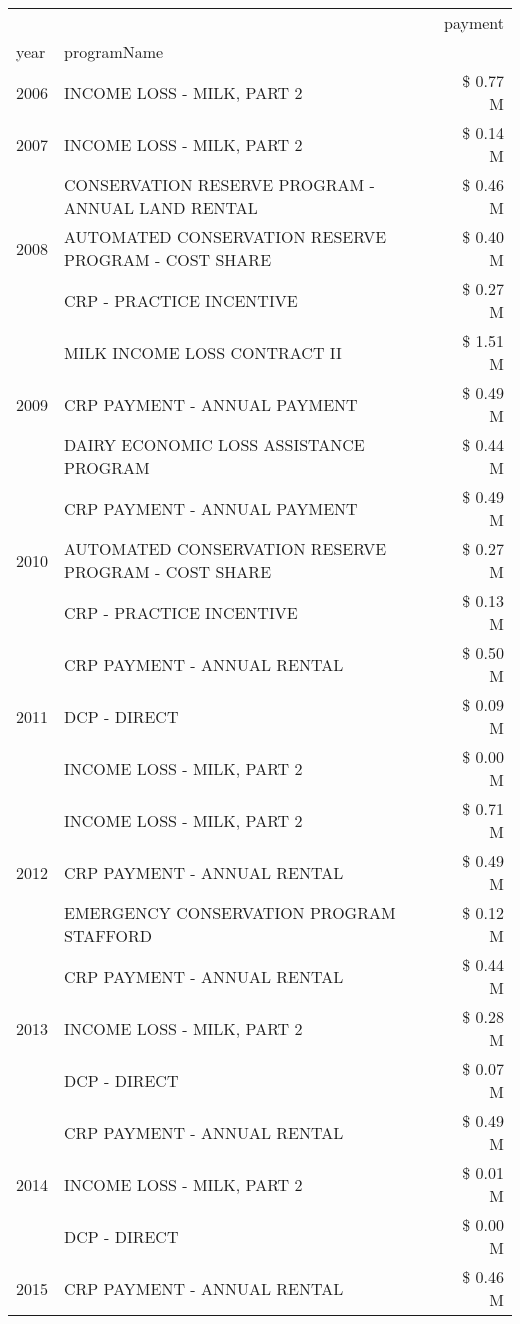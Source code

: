 \begin{tabular}{llr}
\toprule
 &  & payment \\
year & programName &  \\
\midrule
2006 & INCOME LOSS - MILK, PART 2 & \$ 0.77 M \\
\cline{1-3}
2007 & INCOME LOSS - MILK, PART 2 & \$ 0.14 M \\
\cline{1-3}
\multirow[t]{3}{*}{2008} & CONSERVATION RESERVE PROGRAM - ANNUAL LAND RENTAL & \$ 0.46 M \\
 & AUTOMATED CONSERVATION RESERVE PROGRAM - COST SHARE & \$ 0.40 M \\
 & CRP - PRACTICE INCENTIVE & \$ 0.27 M \\
\cline{1-3}
\multirow[t]{3}{*}{2009} & MILK INCOME LOSS CONTRACT II & \$ 1.51 M \\
 & CRP PAYMENT - ANNUAL PAYMENT & \$ 0.49 M \\
 & DAIRY ECONOMIC LOSS ASSISTANCE PROGRAM & \$ 0.44 M \\
\cline{1-3}
\multirow[t]{3}{*}{2010} & CRP PAYMENT - ANNUAL PAYMENT & \$ 0.49 M \\
 & AUTOMATED CONSERVATION RESERVE PROGRAM - COST SHARE & \$ 0.27 M \\
 & CRP - PRACTICE INCENTIVE & \$ 0.13 M \\
\cline{1-3}
\multirow[t]{3}{*}{2011} & CRP PAYMENT - ANNUAL RENTAL & \$ 0.50 M \\
 & DCP - DIRECT & \$ 0.09 M \\
 & INCOME LOSS - MILK, PART 2 & \$ 0.00 M \\
\cline{1-3}
\multirow[t]{3}{*}{2012} & INCOME LOSS - MILK, PART 2 & \$ 0.71 M \\
 & CRP PAYMENT - ANNUAL RENTAL & \$ 0.49 M \\
 & EMERGENCY CONSERVATION PROGRAM STAFFORD & \$ 0.12 M \\
\cline{1-3}
\multirow[t]{3}{*}{2013} & CRP PAYMENT - ANNUAL RENTAL & \$ 0.44 M \\
 & INCOME LOSS - MILK, PART 2 & \$ 0.28 M \\
 & DCP - DIRECT & \$ 0.07 M \\
\cline{1-3}
\multirow[t]{3}{*}{2014} & CRP PAYMENT - ANNUAL RENTAL & \$ 0.49 M \\
 & INCOME LOSS - MILK, PART 2 & \$ 0.01 M \\
 & DCP - DIRECT & \$ 0.00 M \\
\cline{1-3}
\multirow[t]{2}{*}{2015} & CRP PAYMENT - ANNUAL RENTAL & \$ 0.46 M \\

\end{tabular}
